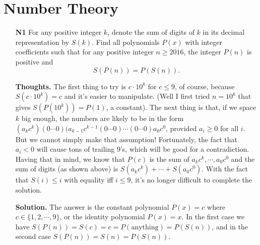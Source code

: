 \documentclass[11pt,a4paper]{article}
\begin{document}
\section{Number Theory}
\begin{itemize}
\item[\textbf{N1}]
For any positive integer $k$, denote the sum of digits of $k$ in its decimal representation by $S(k)$. Find all polynomials $P(x)$ with integer coefficients such that for any positive integer $n \geq 2016$, the integer $P(n)$ is positive and $$S(P(n)) = P(S(n)).$$

\textbf{Thoughts.} 
The first thing to try is $c\cdot 10^k$ for $c\le 9$, of course, 
because $S(c\cdot 10^k)=c$ and it's easier to manipulate. 
(Well I first tried $n=10^k$ that gives $S(P(10^k))=P(1)$, a constant). 
The next thing is that, if we space $k$ big enough, the numbers are likely to be in the form 
$(a_kc^k)(0\cdots 0)(a_{k-1}c^{k-1}(0\cdots 0)\cdots (0\cdots 0)a_0c^0$, 
provided $a_i\ge 0$ for all $i$. 
But we cannot simply make that assumption! 
Fortunately, the fact that $a_i< 0$ will cause tons of trailing 9's, which will be good for a contradiction. 
Having that in mind, we know that $P(c)$ is the sum of $a_kc^k, \cdots , a_0c^0$ and the sum of digits (as shown above) is 
$S(a_kc^k)+\cdots +S(a_0c^0)$. 
With the fact that $S(i)\le i$ with equality iff $i\le 9$, it's no longer difficult to complete the solution. 

\textbf{Solution.} 
The answer is the constant polynomial $P(x)=c$ where $c\in\{1,2,\cdots ,9\}$, 
or the identity polynomial $P(x)=x$. In the first case we have $S(P(n))=S(c)=c=P(\text{anything})=P(S(n))$, 
and in the second case $S(P(n))=S(n)=P(S(n))$. 


\end{itemize}
\end{document}
